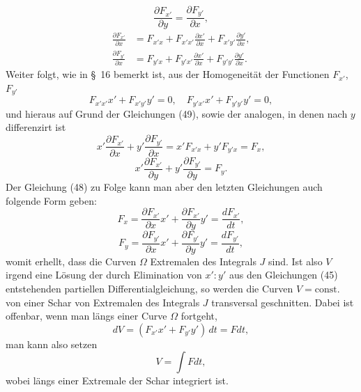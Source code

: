 \documentclass[11pt,a4paper,leqno]{article}
\begin{document}
\begin{equation}\tag{48}
\frac{\partial F_{x'}}{\partial y}=\frac{\partial F_{y'}}{\partial x},
\end{equation}
\begin{equation}\tag{49}
\begin{aligned}
\frac{\partial F_{x'}}{\partial x}
&=
F_{x'x}+F_{x'x'}\frac{\partial x'}{\partial x}
+F_{x'y'}\frac{\partial y'}{\partial x},\\
\frac{\partial F_{y'}}{\partial x}
&=
F_{y'x}+F_{y'x'}\frac{\partial x'}{\partial x}
+F_{y'y'}\frac{\partial y'}{\partial x}.
\end{aligned}
\end{equation}
Weiter folgt, wie in \S~16 bemerkt ist, aus der Homogeneität der Functionen $F_{x'}$, $F_{y'}$
\begin{equation}\tag{50}
F_{x'x'}x'+F_{x'y'}y'=0,\quad
F_{y'x'}x'+F_{y'y'}y'=0,
\end{equation}
und hieraus auf Grund der Gleichungen (49), sowie der analogen, in denen nach $y$ differenzirt ist
\[
x'\frac{\partial F_{x'}}{\partial x}
+y'\frac{\partial F_{y'}}{\partial x}
=
x'F_{x'x}+y'F_{y'x}=F_x,
\]
\[
x'\frac{\partial F_{x'}}{\partial y}
+y'\frac{\partial F_{y'}}{\partial y}=F_y.
\]
Der Gleichung (48) zu Folge kann man aber den letzten Gleichungen auch folgende Form geben:
\[
F_x=
\frac{\partial F_{x'}}{\partial x}x'
+\frac{\partial F_{x'}}{\partial y}y'
=\frac{dF_{x'}}{dt},
\]
\[
F_y=
\frac{\partial F_{y'}}{\partial x}x'
+\frac{\partial F_{y'}}{\partial y}y'
=\frac{dF_{y'}}{dt},
\]
womit erhellt, dass die Curven $\Omega$ Extremalen des Integrals $J$ sind. Ist also $V$ irgend eine Lösung der durch Elimination von $x':y'$ aus den Gleichungen (45) entstehenden partiellen Differentialgleichung, so werden die Curven $V=\text{const.}$ von einer Schar von Extremalen des Integrals $J$ transversal geschnitten. Dabei ist offenbar, wenn man längs einer Curve $\Omega$ fortgeht,
\[
dV=(F_{x'}x'+F_{y'}y')\,dt=Fdt,
\]
man kann also setzen
\[
V=\int Fdt,
\]
wobei längs einer Extremale der Schar integriert ist.
\end{document}
